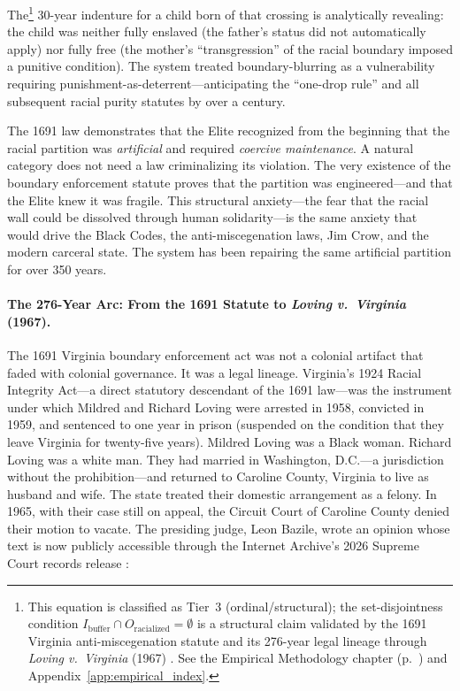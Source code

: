 The\footnote{This equation is classified as Tier~3 (ordinal/structural); the set-disjointness condition $I_{\text{buffer}} \cap O_{\text{racialized}} = \emptyset$ is a structural claim validated by the 1691 Virginia anti-miscegenation statute and its 276-year legal lineage through \textit{Loving v.\ Virginia} (1967) \cite{loving_v_virginia_record_1967}. See the Empirical Methodology chapter (p.~\pageref{ch:empirical_methodology}) and Appendix~\ref{app:empirical_index}.} 30-year indenture for a child born of that crossing is analytically revealing: the child was neither fully enslaved (the father's status did not automatically apply) nor fully free (the mother's ``transgression'' of the racial boundary imposed a punitive condition). The system treated boundary-blurring as a vulnerability requiring punishment-as-deterrent---anticipating the ``one-drop rule'' and all subsequent racial purity statutes by over a century.

The 1691 law demonstrates that the Elite recognized from the beginning that the racial partition was \textit{artificial} and required \textit{coercive maintenance}. A natural category does not need a law criminalizing its violation. The very existence of the boundary enforcement statute proves that the partition was engineered---and that the Elite knew it was fragile. This structural anxiety---the fear that the racial wall could be dissolved through human solidarity---is the same anxiety that would drive the Black Codes, the anti-miscegenation laws, Jim Crow, and the modern carceral state. The system has been repairing the same artificial partition for over 350 years.

\paragraph{The 276-Year Arc: From the 1691 Statute to \textit{Loving v.\ Virginia} (1967).}
The 1691 Virginia boundary enforcement act was not a colonial artifact that faded with colonial governance. It was a legal lineage. Virginia's 1924 Racial Integrity Act---a direct statutory descendant of the 1691 law---was the instrument under which Mildred and Richard Loving were arrested in 1958, convicted in 1959, and sentenced to one year in prison (suspended on the condition that they leave Virginia for twenty-five years). Mildred Loving was a Black woman. Richard Loving was a white man. They had married in Washington, D.C.---a jurisdiction without the prohibition---and returned to Caroline County, Virginia to live as husband and wife. The state treated their domestic arrangement as a felony. In 1965, with their case still on appeal, the Circuit Court of Caroline County denied their motion to vacate. The presiding judge, Leon Bazile, wrote an opinion whose text is now publicly accessible through the Internet Archive's 2026 Supreme Court records release \cite{bazile_opinion_1965, ia_scotus_briefs_2026}:

